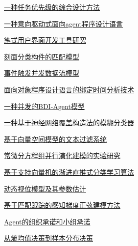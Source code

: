 \documentclass[a4paper]{article}
\begin{document}
\href{http://www.jos.org.cn/ch/reader/download_pdf.aspx?file_no=20030309&year_id=2003&quarter_id=3&falg=1}{一种任务优先级的综合设计方法}

\href{http://www.jos.org.cn/ch/reader/download_pdf.aspx?file_no=20030310&year_id=2003&quarter_id=3&falg=1}{一种意向驱动式面向agent程序设计语言}

\href{http://www.jos.org.cn/ch/reader/download_pdf.aspx?file_no=20030311&year_id=2003&quarter_id=3&falg=1}{笔式用户界面开发工具研究}

\href{http://www.jos.org.cn/ch/reader/download_pdf.aspx?file_no=20030312&year_id=2003&quarter_id=3&falg=1}{刻面分类构件的匹配模型}

\href{http://www.jos.org.cn/ch/reader/download_pdf.aspx?file_no=20030313&year_id=2003&quarter_id=3&falg=1}{事件触发并发数据流模型}

\href{http://www.jos.org.cn/ch/reader/download_pdf.aspx?file_no=20030314&year_id=2003&quarter_id=3&falg=1}{面向对象程序设计语言的绑定时间分析技术}

\href{http://www.jos.org.cn/ch/reader/download_pdf.aspx?file_no=20030315&year_id=2003&quarter_id=3&falg=1}{一种并发的BDI-Agent模型}

\href{http://www.jos.org.cn/ch/reader/download_pdf.aspx?file_no=20030316&year_id=2003&quarter_id=3&falg=1}{一种基于神经网络覆盖构造法的模糊分类器}

\href{http://www.jos.org.cn/ch/reader/download_pdf.aspx?file_no=20030317&year_id=2003&quarter_id=3&falg=1}{基于向量空间模型的文本过滤系统}

\href{http://www.jos.org.cn/ch/reader/download_pdf.aspx?file_no=20030318&year_id=2003&quarter_id=3&falg=1}{常微分方程组并行演化建模的实验研究}

\href{http://www.jos.org.cn/ch/reader/download_pdf.aspx?file_no=20030319&year_id=2003&quarter_id=3&falg=1}{基于支持向量机的渐进直推式分类学习算法}

\href{http://www.jos.org.cn/ch/reader/download_pdf.aspx?file_no=20030320&year_id=2003&quarter_id=3&falg=1}{动态视位模型及其参数估计}

\href{http://www.jos.org.cn/ch/reader/download_pdf.aspx?file_no=20030321&year_id=2003&quarter_id=3&falg=1}{基于匹配跟踪的感知梯度正弦建模方法}

\href{http://www.jos.org.cn/ch/reader/download_pdf.aspx?file_no=20030322&year_id=2003&quarter_id=3&falg=1}{Agent的组织承诺和小组承诺}

\href{http://www.jos.org.cn/ch/reader/download_pdf.aspx?file_no=20030323&year_id=2003&quarter_id=3&falg=1}{从熵均值决策到样本分布决策}
\end{document}
